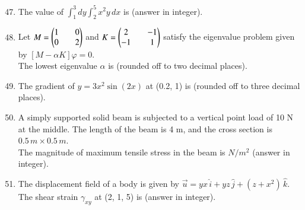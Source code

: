 \documentclass[journal]{IEEEtran}
\theoremstyle{remark}
\begin{document}
\begin{enumerate}[itemsep=1em]
\setcounter{enumi}{46}
    \item The value of $\int_1^3dy\int_2^5x^2y\,dx$ is \underline{\hspace{2cm}} (answer in integer).
\end{enumerate}

\begin{enumerate}[itemsep=1em]
\setcounter{enumi}{47}
\item Let $M=\begin{pmatrix}1&&0\\0&&2\end{pmatrix}$ and $K=\begin{pmatrix}2&&-1\\-1&&1\end{pmatrix}$  satisfy the eigenvalue problem given by $[M-\alpha K]\varphi=0$.\\
The lowest eigenvalue $\alpha$ is \underline{\hspace{1cm}} (rounded off to two decimal places). 
\end{enumerate}

\begin{enumerate}[itemsep=1em]
\setcounter{enumi}{48}
\item The gradient of $y=3x^2\sin(2x)$ at (0.2, 1) is \underline{\hspace{1cm}}(rounded off to three decimal places). 
\end{enumerate}

\begin{enumerate}[itemsep=1em]
\setcounter{enumi}{49}
\item A simply supported solid beam is subjected to a vertical point load of 10 N at the middle. The length of the beam is 4 m, and the cross section is $0.5 \,m \times 0.5 \,m$.\\  
The magnitude of maximum tensile stress in the beam is \underline{\hspace{1cm}} $N/m^2$ (answer in integer). 
\end{enumerate}

\begin{enumerate}[itemsep=1em]
\setcounter{enumi}{50}
\item The displacement field of a body is given by $\vec{u}=yx\,\hat{i} + yz\,\hat{j} + (z+x^2)\,\hat{k}$. The shear strain $\gamma_{xy}$ at (2, 1, 5) is \underline{\hspace{2cm}}(answer in integer). 
\end{enumerate}
\end{document}
